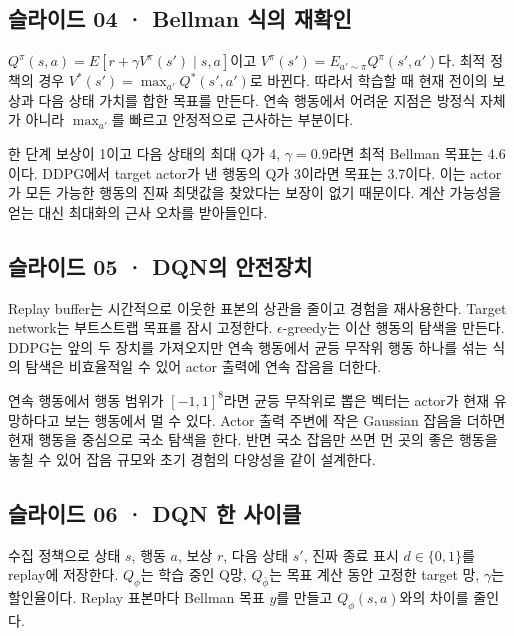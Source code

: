 \documentclass[11pt,a4paper]{article}
\begin{document}
\subsection{슬라이드 04 · Bellman 식의 재확인}

$Q^\pi(s,a)=E[r+\gamma V^\pi(s')\mid s,a]$이고 $V^\pi(s')=E_{a'\sim\pi}Q^\pi(s',a')$다. 최적 정책의 경우 $V^*(s')=\max_{a'}Q^*(s',a')$로 바뀐다. 따라서 학습할 때 현재 전이의 보상과 다음 상태 가치를 합한 목표를 만든다. 연속 행동에서 어려운 지점은 방정식 자체가 아니라 $\max_{a'}$를 빠르고 안정적으로 근사하는 부분이다.\par

한 단계 보상이 1이고 다음 상태의 최대 Q가 4, $\gamma=0.9$라면 최적 Bellman 목표는 4.6이다. DDPG에서 target actor가 낸 행동의 Q가 3이라면 목표는 3.7이다. 이는 actor가 모든 가능한 행동의 진짜 최댓값을 찾았다는 보장이 없기 때문이다. 계산 가능성을 얻는 대신 최대화의 근사 오차를 받아들인다.\par

\subsection{슬라이드 05 · DQN의 안전장치}

Replay buffer는 시간적으로 이웃한 표본의 상관을 줄이고 경험을 재사용한다. Target network는 부트스트랩 목표를 잠시 고정한다. $\epsilon$-greedy는 이산 행동의 탐색을 만든다. DDPG는 앞의 두 장치를 가져오지만 연속 행동에서 균등 무작위 행동 하나를 섞는 식의 탐색은 비효율적일 수 있어 actor 출력에 연속 잡음을 더한다.\par

연속 행동에서 행동 범위가 $[-1,1]^8$라면 균등 무작위로 뽑은 벡터는 actor가 현재 유망하다고 보는 행동에서 멀 수 있다. Actor 출력 주변에 작은 Gaussian 잡음을 더하면 현재 행동을 중심으로 국소 탐색을 한다. 반면 국소 잡음만 쓰면 먼 곳의 좋은 행동을 놓칠 수 있어 잡음 규모와 초기 경험의 다양성을 같이 설계한다.\par

\subsection{슬라이드 06 · DQN 한 사이클}

수집 정책으로 상태 $s$, 행동 $a$, 보상 $r$, 다음 상태 $s'$, 진짜 종료 표시 $d\in\{0,1\}$를 replay에 저장한다. $Q_\phi$는 학습 중인 Q망, $Q_{\bar\phi}$는 목표 계산 동안 고정한 target 망, $\gamma$는 할인율이다. Replay 표본마다 Bellman 목표 $y$를 만들고 $Q_\phi(s,a)$와의 차이를 줄인다.\par
\end{document}
